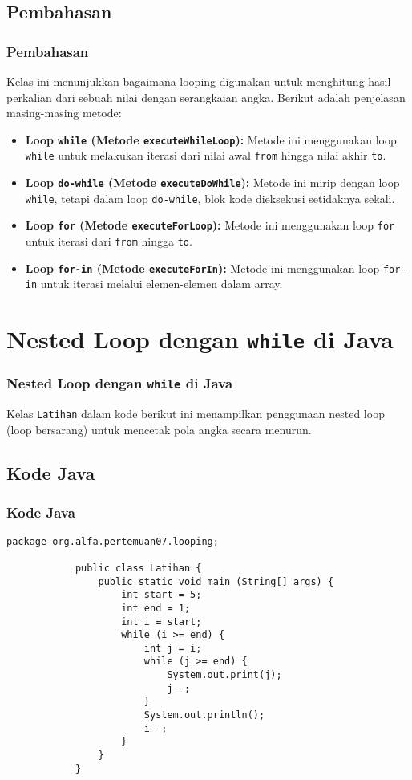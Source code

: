 \documentclass[aspectratio=169, table]{beamer}
\begin{document}
	\subsection{Pembahasan}
	\begin{frame}
		\frametitle{Pembahasan}
		Kelas ini menunjukkan bagaimana looping digunakan untuk menghitung hasil perkalian dari sebuah nilai dengan serangkaian angka. Berikut adalah penjelasan masing-masing metode:
		\begin{itemize}
			\item \textbf{Loop \texttt{while} (Metode \texttt{executeWhileLoop}):} 
			Metode ini menggunakan loop \texttt{while} untuk melakukan iterasi dari nilai awal \texttt{from} hingga nilai akhir \texttt{to}.
			
			\item \textbf{Loop \texttt{do-while} (Metode \texttt{executeDoWhile}):} 
			Metode ini mirip dengan loop \texttt{while}, tetapi dalam loop \texttt{do-while}, blok kode dieksekusi setidaknya sekali.
			
			\item \textbf{Loop \texttt{for} (Metode \texttt{executeForLoop}):} 
			Metode ini menggunakan loop \texttt{for} untuk iterasi dari \texttt{from} hingga \texttt{to}.
			
			\item \textbf{Loop \texttt{for-in} (Metode \texttt{executeForIn}):} 
			Metode ini menggunakan loop \texttt{for-in} untuk iterasi melalui elemen-elemen dalam array.
		\end{itemize}
	\end{frame}
	
	\section{Nested Loop dengan \texttt{while} di Java}
	\begin{frame}
		\frametitle{Nested Loop dengan \texttt{while} di Java}
		Kelas \texttt{Latihan} dalam kode berikut ini menampilkan penggunaan nested loop (loop bersarang) untuk mencetak pola angka secara menurun.
	\end{frame}
	
	\subsection{Kode Java}
	\begin{frame}[fragile]
		\frametitle{Kode Java}
		\begin{lstlisting}[style=JavaStyle]
			package org.alfa.pertemuan07.looping;
			
			public class Latihan {
				public static void main (String[] args) {
					int start = 5;
					int end = 1;
					int i = start;
					while (i >= end) {
						int j = i;
						while (j >= end) {
							System.out.print(j);
							j--;
						}
						System.out.println();
						i--;
					}
				}
			}
		\end{lstlisting}
	\end{frame}
	
\end{document}
